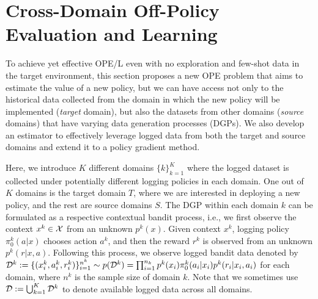 \documentclass{article} %
\theoremstyle{definition}
\begin{document}


\section{Cross-Domain Off-Policy Evaluation and Learning}
To achieve yet effective OPE/L even with no exploration and few-shot data in the target environment, this section proposes a new OPE problem that aims to estimate the value of a new policy, but we can have access not only to the historical data collected from the domain in which the new policy will be implemented (\textit{target} domain), but also the datasets from other domains (\textit{source} domains) that have varying data generation processes (DGPs). We also develop an estimator to effectively leverage logged data from both the target and source domains and extend it to a policy gradient method.


Here, we introduce $K$ different domains $\{k\}_{k=1}^K$ where the logged dataset is collected under potentially different logging policies in each domain. One out of $K$ domains is the target domain $T$, where we are interested in deploying a new policy, and the rest are source domains $S$. The DGP within each domain $k$ can be formulated as a respective contextual bandit process, i.e., we first observe the context $x^{k} \in \mathcal{X}$ from an unknown $p^{k}(x)$. Given context $x^{k}$, logging policy $\pi_0^{k}(a|x)$ chooses action $a^{k}$, and then the reward $r^{k}$ is observed from an unknown $p^{k}(r|x,a)$. Following this process, we observe logged bandit data denoted by $\mathcal{D}^{k} := \{(x_i^{k},a_i^{k},r_i^{k})\}_{i=1}^{n^{k}} \sim p(\mathcal{D}^{k}) = \prod_{i=1}^{n_k} p^{k}(x_i) \pi_0^{k}(a_i|x_i) p^{k}(r_i|x_i,a_i)$ for each domain, where $n^{k}$ is the sample size of domain $k$. Note that we sometimes use $\mathcal{D}:=\bigcup_{k=1}^{K}\mathcal{D}^{k}$ to denote available logged data across all domains. 
\end{document}
